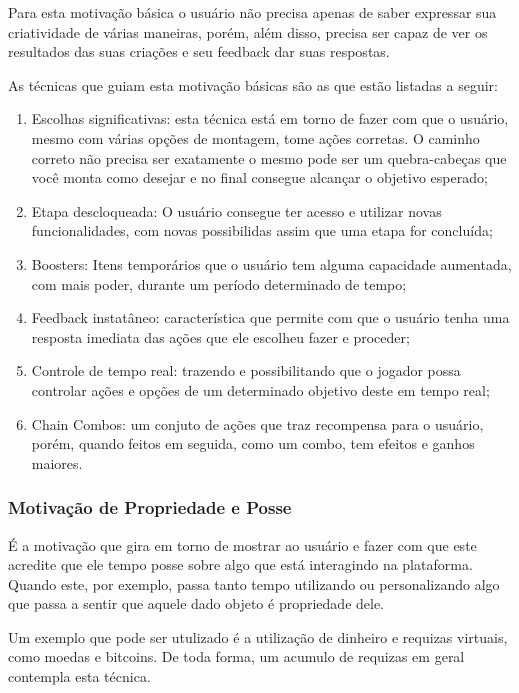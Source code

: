 Para esta motivação básica o usuário não precisa apenas de saber expressar
sua criatividade de várias maneiras, porém, além disso, precisa ser capaz
de ver os resultados das suas criações e seu feedback dar suas respostas.

As técnicas que guiam esta motivação básicas são as que estão listadas
a seguir:

\begin{enumerate}
    \item Escolhas significativas: esta técnica está em torno de fazer
        com que o usuário, mesmo com várias opções de montagem,
        tome ações corretas. O caminho correto não precisa ser exatamente o mesmo
        pode ser um quebra-cabeças que você monta como desejar e no final
        consegue alcançar o objetivo esperado;
    \item Etapa descloqueada: O usuário consegue ter acesso
        e utilizar novas funcionalidades, com novas possibilidas
        assim que uma etapa for concluída;
    \item Boosters: Itens temporários que o usuário tem alguma
        capacidade aumentada, com mais poder, durante um período
        determinado de tempo;
    \item Feedback instatâneo: característica que permite com que o usuário
        tenha uma resposta imediata das ações que ele escolheu fazer e proceder;
    \item Controle de tempo real: trazendo e possibilitando que o jogador
        possa controlar ações e opções de um determinado objetivo deste
        em tempo real;
    \item Chain Combos: um conjuto de ações que traz recompensa para o
        usuário, porém, quando feitos em seguida, como um combo, tem
        efeitos e ganhos maiores.
\end{enumerate}

\subsubsection{Motivação de Propriedade e Posse}
\label{sub:propriedadeeposse}
É a motivação que gira em torno de mostrar ao usuário e fazer com que
este acredite que ele tempo posse sobre algo que está interagindo na
plataforma. Quando este, por exemplo, passa tanto tempo utilizando
ou personalizando algo que passa a sentir que aquele dado objeto
é propriedade dele.

Um exemplo que pode ser utulizado é a utilização de dinheiro e requizas
virtuais, como moedas e bitcoins. De toda forma, um acumulo de requizas
em geral contempla esta técnica.

